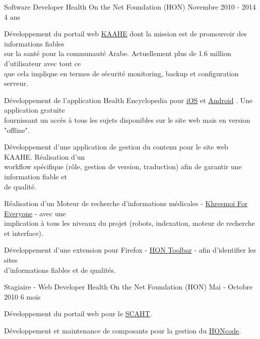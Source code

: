 \begin{cventries}
  \cventry
    {Software Developer}
    {Health On the Net Foundation (HON)}
    {Novembre 2010 - 2014}
    {4 ans}
    {
      \begin{cvitems}
        \item{Développement du portail web
          {\color{awesome-skyblue}\href{http://www.kaahe.org/}{KAAHE}}
          dont la mission est de promouvoir des informations fiables \\
          sur la santé pour la communauté Arabe. Actuellement plus de 1.6
          million d'utilisateur avec tout ce \\que cela implique en termes de
          sécurité monitoring, backup et configuration serveur.
        }
        \item{Développement de l'application Health Encyclopedia pour
          {\color{awesome-skyblue}
            \href{https://itunes.apple.com/us/app/almwsw-t-alshyt/id624559765?l=fr&ls=1&mt=8}{iOS}}
          et
          {\color{awesome-skyblue}
            \href{https://play.google.com/store/apps/details?id=org.kaahe.kaaheApp&hl=en}{Android}}
          . Une application gratuite \\fournissant un accès à tous les sujets
          disponibles sur le site web mais en version "offline".
        }
        \item{Développement d'une application de gestion du contenu pour le
          site web KAAHE. Réalisation d'un \\workflow spécifique (rôle, gestion
          de version, traduction) afin de garantir une information fiable et \\
          de qualité.
        }
        \item{Réalisation d'un Moteur de recherche d'informations médicales -
          {\color{awesome-skyblue}
            \href{http://everyone.khresmoi.eu/}{Khresmoi For Everyone}}
            - avec une \\implication à tous les niveaux du projet (robots,
            indexation, moteur de recherche et interface).
        }
        \item{Développement d'une extension pour Firefox -
          {\color{awesome-skyblue}
          \href{https://addons.mozilla.org/en-US/firefox/addon/hon-toolbar/}{HON Toolbar}} -
          afin d'identifier les sites \\d'informations fiables et de qualités.
        }
      \end{cvitems}
    }

  \cventry
    {Stagiaire - Web Developer}
    {Health On the Net Foundation (HON)}
    {Mai - Octobre 2010}
    {6 mois}
    {
      \begin{cvitems}
        \item{Développement du portail web pour le
          {\color{awesome-skyblue}\href{http://scaht.org/}{SCAHT}}.
        }
        \item{Développement et maintenance de composants pour la gestion du
          {\color{awesome-skyblue}
            \href{http://www.hon.ch/HONcode/Pro/Visitor/visitor.html}{HONcode}}.
        }
      \end{cvitems}
    }


\end{cventries}
